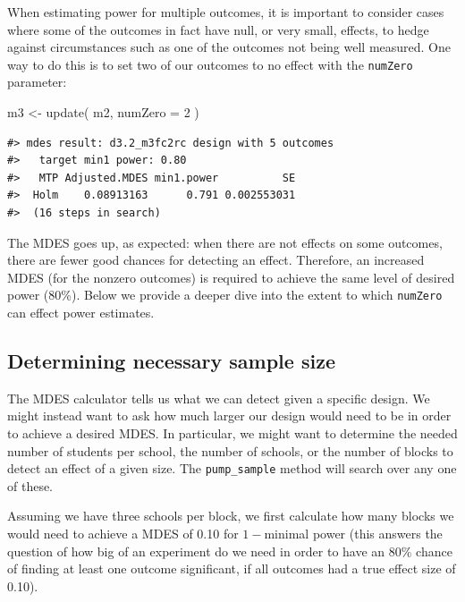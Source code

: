 \documentclass[
]{article}
\newenvironment{Shaded}{\begin{snugshade}}{\end{snugshade}}
\newcommand{\AttributeTok}[1]{\textcolor[rgb]{0.77,0.63,0.00}{#1}}
\newcommand{\DecValTok}[1]{\textcolor[rgb]{0.00,0.00,0.81}{#1}}
\newcommand{\FunctionTok}[1]{\textcolor[rgb]{0.00,0.00,0.00}{#1}}
\newcommand{\NormalTok}[1]{#1}
\newcommand{\OtherTok}[1]{\textcolor[rgb]{0.56,0.35,0.01}{#1}}
\begin{document}
When estimating power for multiple outcomes, it is important to consider
cases where some of the outcomes in fact have null, or very small,
effects, to hedge against circumstances such as one of the outcomes not
being well measured. One way to do this is to set two of our outcomes to
no effect with the \texttt{numZero} parameter:

\begin{Shaded}
\begin{Highlighting}[]
\NormalTok{m3 }\OtherTok{\textless{}{-}} \FunctionTok{update}\NormalTok{( m2, }\AttributeTok{numZero =} \DecValTok{2}\NormalTok{ )}
\end{Highlighting}
\end{Shaded}

\begin{verbatim}
#> mdes result: d3.2_m3fc2rc design with 5 outcomes
#>   target min1 power: 0.80
#>   MTP Adjusted.MDES min1.power          SE
#>  Holm    0.08913163      0.791 0.002553031
#>  (16 steps in search)
\end{verbatim}

The MDES goes up, as expected: when there are not effects on some
outcomes, there are fewer good chances for detecting an effect.
Therefore, an increased MDES (for the nonzero outcomes) is required to
achieve the same level of desired power (80\%). Below we provide a
deeper dive into the extent to which \texttt{numZero} can effect power
estimates.

\subsection{Determining necessary sample size}

The MDES calculator tells us what we can detect given a specific design.
We might instead want to ask how much larger our design would need to be
in order to achieve a desired MDES. In particular, we might want to
determine the needed number of students per school, the number of
schools, or the number of blocks to detect an effect of a given size.
The \texttt{pump\_sample} method will search over any one of these.

Assuming we have three schools per block, we first calculate how many
blocks we would need to achieve a MDES of 0.10 for \(1-\)minimal power
(this answers the question of how big of an experiment do we need in
order to have an 80\% chance of finding at least one outcome
significant, if all outcomes had a true effect size of 0.10).
\end{document}
